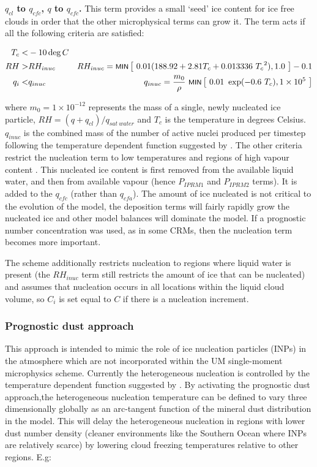 \documentclass{UMDP_article}
\newcommand{\mmin}[1] {\mbox{\footnotesize \sf MIN} \left[#1\right]  }
\begin{document}
\textbf{$q_{cl}$ to $q_{cfc}$, $q$ to $q_{cfc}$.} This term provides a small
`seed' ice content for ice free clouds in order that the other microphysical
terms can grow it. The term acts if all the following criteria are satisfied:

\begin{eqnarray}
T_c   <& -10 \deg C    &   \nonumber\\
RH  >& RH_{inuc}   & RH_{inuc}=\mmin{~0.01(188.92+2.81 T_c +0.013336~{T_c}^2), 1.0~} 
- 0.1 \nonumber \\
q_i <& q_{inuc}    & q_{inuc} = \frac{m_0}{\rho} ~\mmin{~0.01~\exp (-0.6~T_c), 1
\times 10^5~}
\label{eq:mic_um_hetnuc}
\end{eqnarray}

where $m_0=1 \times 10^{-12}$ represents the mass of a single, newly nucleated
ice particle, 
$RH=(q+q_{cl})/q_{sat~water}$ and $T_c$ is the temperature in degrees Celsius.
$q_{inuc}$ is the combined mass of the number of active nuclei produced per 
timestep following the temperature dependent function suggested by 
\cite{Fletcher:1962}. The other criteria restrict the
nucleation term to low temperatures and regions of high vapour content 
\citep{Heymsfield:Milo:1995}. This
nucleated ice content is first removed from the available liquid water, and
then from available vapour (hence $P_{IPRM1}$ and $P_{IPRM2}$
terms). It is added to the
$q_{cfc}$ (rather than $q_{cfa}$). The amount of ice nucleated is not
critical to the evolution of the model, the deposition terms will fairly
rapidly grow the nucleated ice and other model balances will dominate the
model. If a prognostic number concentration was used, as in some CRMs, then
the nucleation term becomes more important.

The scheme additionally restricts nucleation to regions
where liquid water is present (the $RH_{inuc}$ term still restricts the amount
of ice that can be nucleated) and assumes that nucleation occurs in all
locations within the liquid cloud volume, so $C_i$ is set equal to $C$ if
there is a nucleation increment.

\subsubsection{Prognostic dust approach}
\label{sec:tnuc_dust}
This approach is intended to mimic the role of ice nucleation particles (INPs)
in the atmosphere which are not incorporated within the UM single-moment
microphysics scheme. Currently the heterogeneous nucleation is controlled by the
temperature dependent function suggested by \cite{Fletcher:1962}.
By activating the prognostic dust approach,the heterogeneous nucleation
temperature can be defined to vary three dimensionally globally as an arc-tangent
function of the mineral dust distribution in the model. This will delay the heterogeneous
nucleation in regions with lower dust number density (cleaner
environments like the Southern Ocean where INPs are relatively scarce) by
lowering cloud freezing temperatures relative to other regions. E.g:
\end{document}
